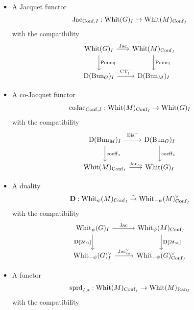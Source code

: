 \begin{itemize}
    \item A Jacquet functor
        \[\mathrm{Jac}_{\mathrm{Conf},I} : \mathrm{Whit}(G)_I \to \mathrm{Whit}(M)_{\mathrm{Conf}_I}\]
    with the compatibility
        \begin{equation}
        \label{eqn:Jac_Conf_I_Poinc}
        \begin{tikzcd}[
          column sep={8em,between origins},
          row sep={4em,between origins}
        ]
            \Whit(G)_I \arrow[r, "\Jac"] \arrow[d, "\Poinc_!"] & \Whit(M)_{\Conf_I} \arrow[d, "\Poinc_!"] \\
            \DMod(\Bun_G)_I \arrow[r, "\CT_!^-"] & \DMod(\Bun_M)_I
        \end{tikzcd}
        \end{equation}
    \item A co-Jacquet functor    
        \[\mathrm{co}\mathrm{Jac}_{\mathrm{Conf},I} : \mathrm{Whit}(M)_{\mathrm{Conf}_I} \to \mathrm{Whit}(G)_I\]
    with the compatibility
        \begin{equation}
        \label{eqn:Jac_co_Conf_I_coeff}
        \begin{tikzcd}[
          column sep={8em,between origins},
          row sep={4em,between origins}
        ]
            \DMod(\Bun_M)_I \arrow[r, "\Eis_!^-"] \arrow[d, "\coeff_*"] & \DMod(\Bun_G)_I \arrow[d, "\coeff_*"] \\
            \Whit(M)_{\Conf_I} \arrow[r, "\Jac_\co"] & \Whit(G)_I
        \end{tikzcd}
        \end{equation}        
    \item A duality
        \[\mathbf{D} : \mathrm{Whit}_\psi(M)_{\mathrm{Conf}_I} \overset{\sim}{\rightarrow} \mathrm{Whit}_{-\psi}(M)_{\mathrm{Conf}_I}^\vee\]
    with the compatibility
        \begin{equation}
        \label{eqn:Jac_I_duality}
        \begin{tikzcd}[
          column sep={10em,between origins},
          row sep={4em,between origins}
        ]
            \Whit_\psi(G)_I \arrow[r, "\Jac"] \arrow[d, "\DD{[2\delta_G]}" left] & \Whit_\psi(M)_{\Conf_I} \arrow[d, "\DD{[2\delta_M]}"] \\
            \Whit_{-\psi}(G)_I^\vee \arrow[r, "\Jac_\co^\vee"] & \Whit_{-\psi}(G)_{\Conf_I}^\vee
        \end{tikzcd}
        \end{equation}
    \item A functor
        \[\mathrm{sprd}_{I,*} : \mathrm{Whit}(M)_{\mathrm{Conf}_I} \to \mathrm{Whit}(M)_{\mathrm{Ran}_I}\]
    with the compatibility
        \begin{equation}

\end{equation}
\end{itemize}
